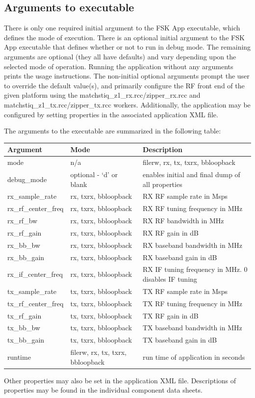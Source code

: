 \subsection{Arguments to executable}
There is only one required initial argument to the FSK App executable, which defines the mode of execution. There is an optional initial argument to the FSK App executable that defines whether or not to run in debug mode. The remaining arguments are optional (they all have defaults) and vary depending upon the selected mode of operation. Running the application without any arguments prints the usage instructions. The non-initial optional arguments prompt the user to override the default value(s), and primarily configure the RF front end of the given platform using the matchstiq\_z1\_rx.rcc/zipper\_rx.rcc and matchstiq\_z1\_tx.rcc/zipper\_tx.rcc workers. Additionally, the application may be configured by setting properties in the associated application XML file.\par\medskip
\noindent The arguments to the executable are summarized in the following table:\\
\begin{tabular}{|l|l|l|}
\hline
\rowcolor{blue}
Argument & Mode & Description \\
\hline
mode & n/a & filerw, rx, tx, txrx, bbloopback\\
\hline
debug\_mode & optional - `d' or blank & enables initial and final dump of all properties\\
\hline
rx\_sample\_rate & rx, txrx, bbloopback & RX RF sample rate in Msps\\
\hline
rx\_rf\_center\_freq & rx, txrx, bbloopback & RX RF tuning frequency in MHz\\
\hline
rx\_rf\_bw & rx, txrx, bbloopback & RX RF bandwidth in MHz\\
\hline
rx\_rf\_gain & rx, txrx, bbloopback & RX RF gain in dB\\
\hline
rx\_bb\_bw & rx, txrx, bbloopback & RX baseband bandwidth in MHz\\
\hline
rx\_bb\_gain & rx, txrx, bbloopback & RX baseband gain in dB\\
\hline
rx\_if\_center\_freq & rx, txrx, bbloopback & RX IF tuning frequency in MHz. 0 disables IF tuning\\
\hline
tx\_sample\_rate & tx, txrx, bbloopback & TX RF sample rate in Msps\\
\hline
tx\_rf\_center\_freq & tx, txrx, bbloopback & TX RF tuning frequency in MHz\\
\hline
tx\_rf\_gain & tx, txrx, bbloopback & TX RF gain in dB\\
\hline
tx\_bb\_bw & tx, txrx, bbloopback & TX baseband bandwidth in MHz\\
\hline
tx\_bb\_gain & tx, txrx, bbloopback & TX baseband gain in dB\\
\hline
runtime & filerw, rx, tx, txrx, bbloopback & run time of application in seconds\\
\hline
\end{tabular}\par\medskip
\noindent Other properties may also be set in the application XML file. Descriptions of properties may be found in the individual component data sheets.

